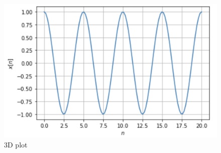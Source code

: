 \documentclass[journal,12pt,twocolumn]{IEEEtran}
\begin{document}
\begin{figure}[b]
         \includegraphics[width=\columnwidth]{figure.png}
         \caption{3D plot}
         \label{plot}
\end{figure}
\end{document}
